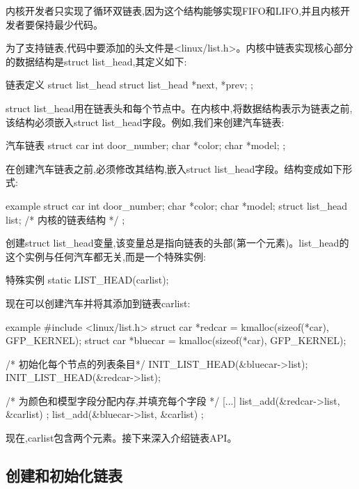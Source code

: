 \documentclass[lang=cn,newtx,10pt,scheme=chinese]{elegantbook}
\begin{document}
内核开发者只实现了循环双链表,因为这个结构能够实现FIFO和LIFO,并且内核开发者要保持最少代码。

为了支持链表,代码中要添加的头文件是<linux/list.h>。内核中链表实现核心部分的数据结构是struct list\_head,其定义如下:

\begin{mycode}{链表定义}
struct list_head {
    struct list_head *next, *prev;
};
\end{mycode}

struct list\_head用在链表头和每个节点中。在内核中,将数据结构表示为链表之前,该结构必须嵌入struct list\_head字段。例如,我们来创建汽车链表:

\begin{mycode}{汽车链表}
struct car {
    int door_number;
    char *color;
    char *model;
};
\end{mycode}

在创建汽车链表之前,必须修改其结构,嵌入struct list\_head字段。结构变成如下形式:

\begin{mycode}{example}
struct car {
    int door_number;
    char *color;
    char *model;
    struct list_head list; /* 内核的链表结构 */
};
\end{mycode}

创建struct list\_head变量,该变量总是指向链表的头部(第一个元素)。list\_head的这个实例与任何汽车都无关,而是一个特殊实例:

\begin{mycode}{特殊实例}
    static LIST_HEAD(carlist);
\end{mycode}

现在可以创建汽车并将其添加到链表carlist:

\begin{mycode}{example}
#include <linux/list.h>
struct car *redcar = kmalloc(sizeof(*car), GFP_KERNEL);
struct car *bluecar = kmalloc(sizeof(*car), GFP_KERNEL);

/* 初始化每个节点的列表条目*/
INIT_LIST_HEAD(&bluecar->list);
INIT_LIST_HEAD(&redcar->list);

/* 为颜色和模型字段分配内存,并填充每个字段 */
[...]
list_add(&redcar->list, &carlist) ;
list_add(&bluecar->list, &carlist) ;
\end{mycode}

现在,carlist包含两个元素。接下来深入介绍链表API。

\subsection{创建和初始化链表}
\end{document}
